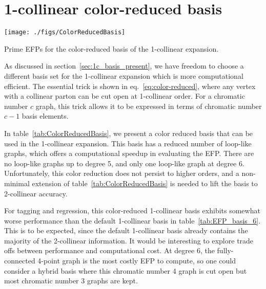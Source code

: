 \documentclass[a4paper,11pt]{article}
\newcommand{\eq}[1]{eq.~\eqref{eq:#1}}
\renewcommand{\sec}[1]{section~\ref{sec:#1}}
\newcommand{\tab}[1]{table~\ref{tab:#1}}
\begin{document}
\section{1-collinear color-reduced basis}
\label{app:color-reduced}

    \begin{table}[t]\centering
      \texttt{[image: ./figs/ColorReducedBasis]}  
      \caption{Prime EFPs for the color-reduced basis of the 1-collinear expansion.  \label{tab:ColorReducedBasis}}
     \end{table}
     

As discussed in \sec{1c_basis_present}, we have freedom to choose a different basis set for the 1-collinear expansion which is more computational efficient.
%
The essential trick is shown in \eq{color-reduced}, where any vertex with a collinear parton can be cut open at 1-collinear order.
%
For a chromatic number $c$ graph, this trick allows it to be expressed in terms of chromatic number $c-1$ basis elements.


In \tab{ColorReducedBasis}, we present a color reduced basis that can be used in the 1-collinear expansion.
%
This basis has a reduced number of loop-like graphs, which offers a computational speedup in evaluating the EFP.
%
There are no loop-like graphs up to degree 5, and only one loop-like graph at degree 6.
%
Unfortunately, this color reduction does not persist to higher orders, and a non-minimal extension of \tab{ColorReducedBasis} is needed to lift the basis to 2-collinear accuracy.


For tagging and regression, this color-reduced 1-collinear basis exhibits somewhat worse performance than the default 1-collinear basis in \tab{EFP_basis_6}.
%
This is to be expected, since the default 1-collinear basis already contains the majority of the 2-collinear information.
%
It would be interesting to explore trade offs between performance and computational cost.
%
At degree 6, the fully-connected 4-point graph is the most costly EFP to compute, so one could consider a hybrid basis where this chromatic number 4 graph is cut open but most chromatic number 3 graphs are kept.





\end{document}
